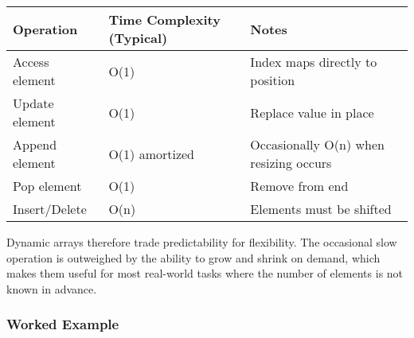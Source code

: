 \documentclass[
  letterpaper,
  DIV=11,
  numbers=noendperiod]{scrreprt}
\begin{document}
\begin{longtable}[]{@{}
  >{\raggedright\arraybackslash}p{}
  >{\raggedright\arraybackslash}p{}
  >{\raggedright\arraybackslash}p{}@{}}
\toprule\noalign{}
\begin{minipage}[b]{\linewidth}\raggedright
Operation
\end{minipage} & \begin{minipage}[b]{\linewidth}\raggedright
Time Complexity (Typical)
\end{minipage} & \begin{minipage}[b]{\linewidth}\raggedright
Notes
\end{minipage} \\
\midrule\noalign{}
\endhead
\bottomrule\noalign{}
\endlastfoot
Access element & O(1) & Index maps directly to position \\
Update element & O(1) & Replace value in place \\
Append element & O(1) amortized & Occasionally O(n) when resizing
occurs \\
Pop element & O(1) & Remove from end \\
Insert/Delete & O(n) & Elements must be shifted \\
\end{longtable}

Dynamic arrays therefore trade predictability for flexibility. The
occasional slow operation is outweighed by the ability to grow and
shrink on demand, which makes them useful for most real-world tasks
where the number of elements is not known in advance.

\subsubsection{Worked Example}\label{worked-example-2}
\end{document}
